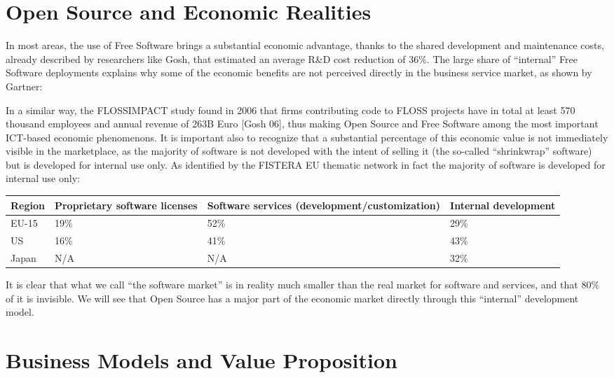 \section*{Open Source and Economic Realities}

In most areas, the use of Free Software brings a substantial economic advantage,
thanks to the shared development and maintenance costs, already described by
researchers like Gosh, that estimated an average R\&D cost reduction of 36\%.
The large share of ``internal'' Free Software deployments explains why some of the economic benefits are not perceived directly in the business service market, as shown by Gartner:

In a similar way, the FLOSSIMPACT study found in 2006 that firms contributing
code to FLOSS projects have in total at least 570 thousand employees and annual
revenue of 263B Euro [Gosh 06], thus making Open Source and Free Software among the most important ICT-based economic phenomenons. It is important also to recognize that a substantial percentage of this economic value is not immediately visible in the marketplace, as the majority of software is not developed with the intent of selling it (the so-called ``shrinkwrap'' software) but is developed for internal use only. As identified by the FISTERA EU thematic network in fact the majority of software is developed for internal use only:

\begin{tabularx}{\textwidth}{|X|X|X|X|}
\hline
Region & Proprietary software licenses & Software services
(de\-vel\-op\-ment/\-cus\-tom\-i\-za\-ti\-on) & Internal development\\
\hline
EU-15 & 19\% & 52\% & 29\% \\
\hline
US & 16\% & 41\% & 43\% \\
\hline
Japan & N/A & N/A & 32\% \\
\hline
\end{tabularx}

It is clear that what we call ``the software market'' is in reality much smaller
than the real market for software and services, and that 80\% of it is
invisible. We will see that Open Source has a major part of the economic market
directly through this ``internal'' development model.

\section*{Business Models and Value Proposition}

